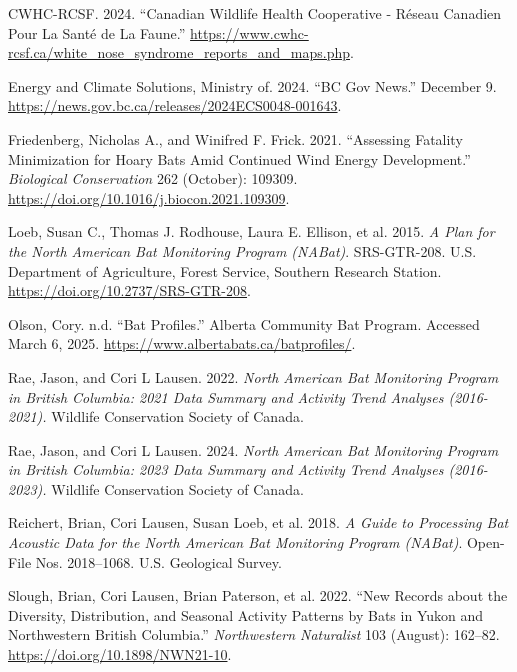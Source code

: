 \documentclass[
  letterpaper,
  DIV=11,
  numbers=noendperiod]{scrartcl}
\newlength{\cslhangindent}
\newenvironment{CSLReferences}[2] %
 {\begin{list}{}{%
  \setlength{\itemindent}{0pt}
  \setlength{\leftmargin}{0pt}
  \setlength{\parsep}{0pt}
  \ifodd #1
   \setlength{\leftmargin}{\cslhangindent}
   \setlength{\itemindent}{-1\cslhangindent}
  \fi
  \setlength{\itemsep}{#2\baselineskip}}}
 {\end{list}}
\begin{document}
\protect{}\label{refs}
\begin{CSLReferences}{1}{1}
CWHC-RCSF. 2024. {``Canadian {Wildlife Health Cooperative} - {Réseau}
Canadien Pour La Santé de La Faune.''}
\url{https://www.cwhc-rcsf.ca/white_nose_syndrome_reports_and_maps.php}.

Energy and Climate Solutions, Ministry of. 2024. {``{BC Gov News}.''}
December 9. \url{https://news.gov.bc.ca/releases/2024ECS0048-001643}.

Friedenberg, Nicholas A., and Winifred F. Frick. 2021. {``Assessing
Fatality Minimization for Hoary Bats Amid Continued Wind Energy
Development.''} \emph{Biological Conservation} 262 (October): 109309.
\url{https://doi.org/10.1016/j.biocon.2021.109309}.

Loeb, Susan C., Thomas J. Rodhouse, Laura E. Ellison, et al. 2015.
\emph{A Plan for the {North American Bat Monitoring Program} ({NABat})}.
SRS-GTR-208. U.S. Department of Agriculture, Forest Service, Southern
Research Station. \url{https://doi.org/10.2737/SRS-GTR-208}.

Olson, Cory. n.d. {``Bat {Profiles}.''} Alberta Community Bat Program.
Accessed March 6, 2025. \url{https://www.albertabats.ca/batprofiles/}.

Rae, Jason, and Cori L Lausen. 2022. \emph{North {American Bat
Monitoring Program} in {British Columbia}: 2021 {Data Summary} and
{Activity Trend Analyses} (2016-2021).} Wildlife Conservation Society of
Canada.

Rae, Jason, and Cori L Lausen. 2024. \emph{North {American Bat
Monitoring Program} in {British Columbia}: 2023 {Data Summary} and
{Activity Trend Analyses} (2016-2023).} Wildlife Conservation Society of
Canada.

Reichert, Brian, Cori Lausen, Susan Loeb, et al. 2018. \emph{A {Guide}
to {Processing Bat Acoustic Data} for the {North American Bat Monitoring
Program} ({NABat})}. Open-File Nos. 2018--1068. U.S. Geological Survey.

Slough, Brian, Cori Lausen, Brian Paterson, et al. 2022. {``New Records
about the Diversity, Distribution, and Seasonal Activity Patterns by
Bats in {Yukon} and Northwestern {British Columbia}.''}
\emph{Northwestern Naturalist} 103 (August): 162--82.
\url{https://doi.org/10.1898/NWN21-10}.


\end{CSLReferences}
\end{document}

